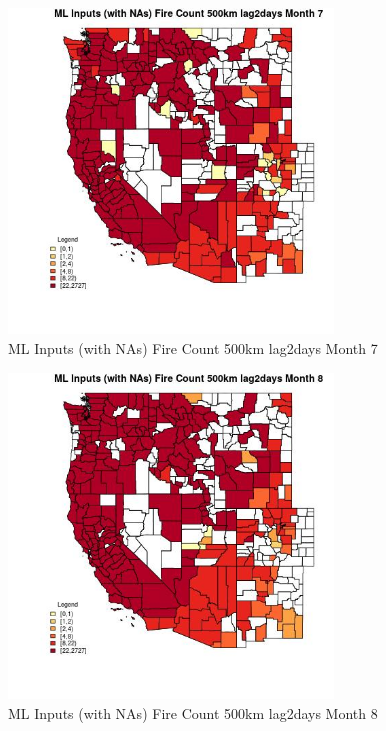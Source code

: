 \begin{figure} 
\centering  
\includegraphics[width=0.77\textwidth]{Code_Outputs/Report_ML_input_PM25_Step4_part_f_de_duplicated_aves_prioritize_24hr_obswNAs_CountyFire_Count_500km_lag2daysmedianMonth7.jpg} 
\caption{\label{fig:Report_ML_input_PM25_Step4_part_f_de_duplicated_aves_prioritize_24hr_obswNAsCountyFire_Count_500km_lag2daysmedianMonth7}ML Inputs (with NAs) Fire Count 500km lag2days Month 7} 
\end{figure} 
 

\begin{figure} 
\centering  
\includegraphics[width=0.77\textwidth]{Code_Outputs/Report_ML_input_PM25_Step4_part_f_de_duplicated_aves_prioritize_24hr_obswNAs_CountyFire_Count_500km_lag2daysmedianMonth8.jpg} 
\caption{\label{fig:Report_ML_input_PM25_Step4_part_f_de_duplicated_aves_prioritize_24hr_obswNAsCountyFire_Count_500km_lag2daysmedianMonth8}ML Inputs (with NAs) Fire Count 500km lag2days Month 8} 
\end{figure} 
 

